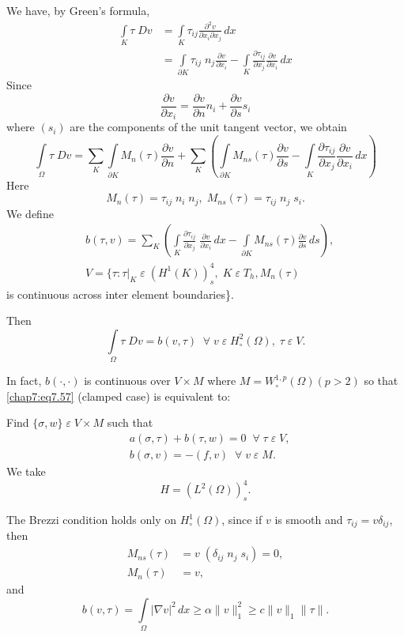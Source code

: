 We have, by Green's formula,
\begin{align*}
\int\limits_K\tau \;Dv &= \int\limits_K\tau_{ij} \frac{\partial^2v}
{\partial x_i\partial x_j}\,dx\\
&= \int\limits_{\partial K}\tau_{ij}\;n_j\frac{\partial v}{\partial
x_i}-\int\limits_K \frac{\partial\tau_{ij}}{\partial x_j}
\frac{\partial v}{\partial x_i}\,dx
\end{align*}
Since
$$
\frac{\partial v}{\partial x_i}=\frac{\partial v}{\partial n}n_i+
\frac{\partial v}{\partial s}s_i
$$
where $(s_i)$ are the components of the unit tangent vector, we obtain
$$
\int\limits_\Omega\tau \;Dv=\sum\limits_K\int\limits_{\partial K}M_n
(\tau)\frac{\partial v}{\partial n}+\sum\limits_K\left(
\int\limits_{\partial K}M_{ns}(\tau)\frac{\partial v} {\partial s}-
\int\limits_K\frac{\partial\tau_{ij}}{\partial x_j} \frac{\partial v}
{\partial x_i}\,dx\right)
$$
Here 
$$
M_n(\tau)=\tau_{ij}\;n_i\;n_j,\;M_{ns}(\tau)=\tau_{ij}\;n_j\;s_i.
$$\pageoriginale
We define
\begin{align*}
&b(\tau,v)=\sum\limits_K\left(\int\limits_K\frac{\partial\tau_{ij}}
{\partial x_j}\;\frac{\partial v}{\partial x_i}\,dx-
\int\limits_{\partial K}M_{ns}(\tau)\frac{\partial v} {\partial s}
\,ds\right), \\
&V=\{\tau:\tau|_K\;\varepsilon \;(H^1(K))_s^4,\;K\;\varepsilon \;T_h,
M_n(\tau) 
\end{align*}
is continuous across inter element boundaries\}.

Then 
$$
\int\limits_\Omega\tau \;Dv=b(v,\tau)\; \; \forall \;v\;\varepsilon
\;H_\circ^2(\Omega), \;\tau \;\varepsilon \;V.
$$

In fact, $b(\cdotp,\cdotp)$ is continuous over $V\times M$ where
$M=W_\circ^{1,p}(\Omega)(p>2)$ so that \eqref{chap7:eq7.57} (clamped
case) is equivalent to:

Find $\{\sigma,w\}\;\varepsilon \;V\times M$ such that 
\begin{equation}\label{chap7:eq7.59}
\begin{aligned}
&a(\sigma,\tau)+b(\tau,w)=0\; \; \forall \;\tau \;\varepsilon \;V,\\
&b(\sigma,v)=-(f,v)\; \; \forall \;v\;\varepsilon \;M.
\end{aligned}
\end{equation}
We take 
$$
H=(L^2(\Omega))_s^4.
$$

The Brezzi condition holds only on $H_\circ^1(\Omega)$, since if $v$
is smooth and $\tau_{ij}=v\delta_{ij}$, then 
\begin{align*}
M_{ns}(\tau) &= v\;(\delta_{ij}\;n_j\;s_i)=0,\\
M_n(\tau) &= v,
\end{align*}
and\pageoriginale
$$
b(v,\tau)=\int\limits_\Omega|\nabla v|^2\,dx\geq\alpha\parallel
v\parallel_1^2\geq c\parallel v\parallel_1\parallel\tau\parallel.
$$

